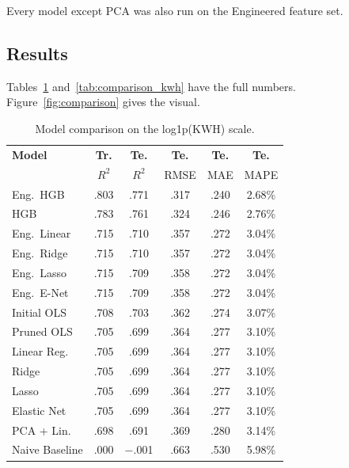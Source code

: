 \documentclass[10pt,twocolumn]{article}
\begin{document}
Every model except PCA was also run on the Engineered feature set.

\subsection{Results}

Tables~\ref{tab:comparison_log} and~\ref{tab:comparison_kwh} have the full numbers. Figure~\ref{fig:comparison} gives the visual.

\begin{table}[H]
\centering
\caption{Model comparison on the log1p(KWH) scale.}
\label{tab:comparison_log}
\small
\setlength{\tabcolsep}{3pt}
\begin{tabular}{@{}lccccc@{}}
\toprule
\textbf{Model} & \textbf{Tr.} & \textbf{Te.} & \textbf{Te.} & \textbf{Te.} & \textbf{Te.}\\
               & $R^2$ & $R^2$ & RMSE & MAE & MAPE\\
\midrule
Eng.\ HGB         & .803 & .771 & .317 & .240 & 2.68\%\\
HGB                & .783 & .761 & .324 & .246 & 2.76\%\\
Eng.\ Linear       & .715 & .710 & .357 & .272 & 3.04\%\\
Eng.\ Ridge        & .715 & .710 & .357 & .272 & 3.04\%\\
Eng.\ Lasso        & .715 & .709 & .358 & .272 & 3.04\%\\
Eng.\ E-Net        & .715 & .709 & .358 & .272 & 3.04\%\\
Initial OLS        & .708 & .703 & .362 & .274 & 3.07\%\\
Pruned OLS         & .705 & .699 & .364 & .277 & 3.10\%\\
Linear Reg.        & .705 & .699 & .364 & .277 & 3.10\%\\
Ridge              & .705 & .699 & .364 & .277 & 3.10\%\\
Lasso              & .705 & .699 & .364 & .277 & 3.10\%\\
Elastic Net        & .705 & .699 & .364 & .277 & 3.10\%\\
PCA + Lin.         & .698 & .691 & .369 & .280 & 3.14\%\\
Naive Baseline     & .000 & $-$.001 & .663 & .530 & 5.98\%\\
\bottomrule
\end{tabular}
\end{table}
\end{document}
